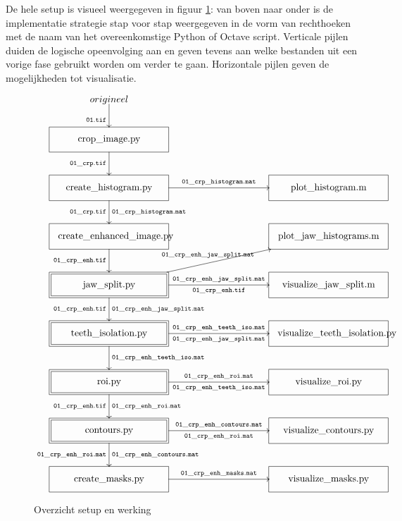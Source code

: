 \documentclass[10pt,a4paper]{article}
\begin{document}
De hele setup is visueel weergegeven in figuur \ref{fig:setup}: van boven naar onder is de implementatie strategie stap voor stap weergegeven in de vorm van rechthoeken met de naam van het overeenkomstige Python of Octave script. Verticale pijlen duiden de logische opeenvolging aan en geven tevens aan welke bestanden uit een vorige fase gebruikt worden om verder te gaan. Horizontale pijlen geven de mogelijkheden tot visualisatie.

\begin{figure}
\centering
\[ \entrymodifiers={+++[F-]}
\SelectTips{cm}{}
\xymatrix {
	*{origineel} 										\ar[d]_{\tt 01.tif} \\
	\parbox{3.75cm}{\centering crop\_image.py} 					\ar[d]_{\tt 01\_crp.tif} \\
	\parbox{3.75cm}{\centering create\_histogram.py} 			\ar[d]_{\tt 01\_crp.tif}^{\tt 01\_crp\_histogram.mat}
		\ar[rr]^{\tt 01\_crp\_histogram.mat} &*{\hspace{2cm}} & \parbox{3.75cm}{\centering plot\_histogram.m} \\
	\parbox{3.75cm}{\centering create\_enhanced\_image.py} 		\ar[d]	_{\tt 01\_crp\_enh.tif}	
	&*{\hspace{2cm}} & \parbox{3.75cm}{\centering plot\_jaw\_histograms.m} \\
	*+++[F=]{\parbox{3.75cm}{\centering jaw\_split.py}} 					\ar[d]_{\tt 01\_crp\_enh.tif}^{\tt 01\_crp\_enh\_jaw\_split.mat}
		\ar[rru]^{\tt 01\_crp\_enh\_jaw\_split.mat}  \ar[rr]^{\tt 01\_crp\_enh\_jaw\_split.mat}_{\tt 01\_crp\_enh.tif}
		&*{\hspace{2cm}} & \parbox{3.75cm}{\centering visualize\_jaw\_split.m} \\
	*+++[F=]{\parbox{3.75cm}{\centering teeth\_isolation.py}} 				\ar[d]	^{\tt 01\_crp\_enh\_teeth\_iso.mat}
		\ar[rr]^{\tt 01\_crp\_enh\_teeth\_iso.mat}_{\tt 01\_crp\_enh\_jaw\_split.mat} &*{\hspace{2cm}} & \parbox{3.75cm}{\centering visualize\_teeth\_isolation.py} \\
	*+++[F=]{\parbox{3.75cm}{\centering roi.py}}							\ar[d]	_{\tt 01\_crp\_enh.tif}^{\tt 01\_crp\_enh\_roi.mat}
		\ar[rr]^{\tt 01\_crp\_enh\_roi.mat}_{\tt 01\_crp\_enh\_teeth\_iso.mat} &*{\hspace{2cm}} & \parbox{3.75cm}{\centering visualize\_roi.py} \\
	*+++[F=]{\parbox{3.75cm}{\centering contours.py}}
		\ar[rr]^{\tt 01\_crp\_enh\_contours.mat}_{\tt 01\_crp\_enh\_roi.mat}
		\ar[d]^{\tt 01\_crp\_enh\_contours.mat}_{\tt 01\_crp\_enh\_roi.mat} &*{\hspace{2cm}} &  \parbox{3.75cm}{\centering visualize\_contours.py} \\
	\parbox{3.75cm}{\centering create\_masks.py}
		\ar[rr]^{\tt 01\_crp\_enh\_masks.mat} &*{\hspace{2cm}} &  \parbox{3.75cm}{\centering visualize\_masks.py} \\
}
\]
\caption{Overzicht setup en werking}
\label{fig:setup}
\end{figure}
\end{document}
